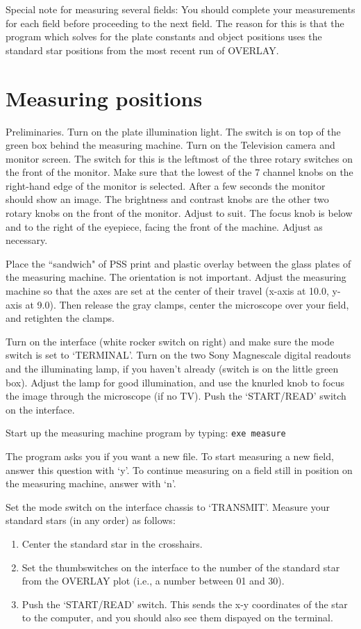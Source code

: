 Special note for measuring several fields: You should complete your
measurements for each field before proceeding to the next field. The reason for
this is that the program which solves for the plate constants and object
positions uses the standard star positions from the most recent run of OVERLAY. 



\section{Measuring positions} 
\label{.pos} 

Preliminaries. Turn on the plate illumination light. The switch is on top of
the green box behind the measuring machine. Turn on the Television camera and
monitor screen. The switch for this is the leftmost of the three rotary
switches on the front of the monitor. Make sure that the lowest of the 7
channel knobs on the right-hand edge of the monitor is selected. After a few
seconds the monitor should show an image. The brightness and contrast knobs are
the other two rotary knobs on the front of the monitor. Adjust to suit. The
focus knob is below and to the right of the eyepiece, facing the front of the
machine. Adjust as necessary. 

Place the ``sandwich" of PSS print and plastic overlay between the glass plates
of the measuring machine.  The orientation is not important.  Adjust the
measuring machine so that the axes are set at the center of their travel
(x-axis at 10.0, y-axis at 9.0). Then release the gray clamps, center the
microscope over your field, and retighten the clamps. 

Turn on the interface (white rocker switch on right) and make sure the mode
switch is set to `TERMINAL'.  Turn on the two Sony Magnescale digital readouts
and the illuminating lamp, if you haven't already (switch is on the little
green box). Adjust the lamp for good illumination, and use the knurled knob to
focus the image through the microscope (if no TV).  Push the `START/READ'
switch on the interface. 

Start up the measuring machine program by typing: \verb/exe measure/ 

The program asks you if you want a new file. To start measuring a new field,
answer this question with `y'. To continue measuring on a field still in
position on the measuring machine, answer with `n'. 

Set the mode switch on the interface chassis to `TRANSMIT'. Measure your
standard stars (in any order) as follows: 
\begin{enumerate} 
\item Center the standard star in the crosshairs. 
\item Set the thumbswitches on the interface to the number of the standard star
from the OVERLAY plot (i.e., a number between 01 and 30). 
\item Push the `START/READ' switch.  This sends the x-y coordinates of the star
to the computer, and you should also see them dispayed on the terminal. 
\end{enumerate} 

